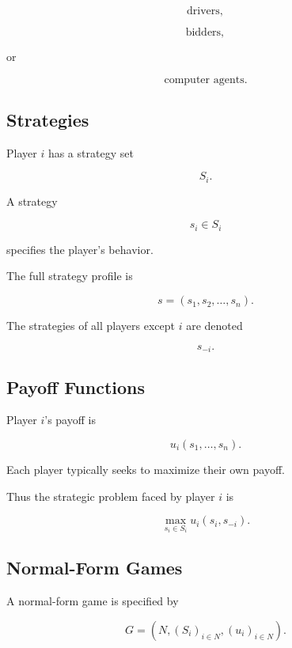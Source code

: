 \[
\boxed{
\text{drivers},
}
\]

\[
\boxed{
\text{bidders},
}
\]

or

\[
\boxed{
\text{computer agents}.
}
\]

\subsection{Strategies}
\label{subsec:game-theory-strategies}

Player \(i\) has a strategy set

\[
\boxed{
S_i.
}
\]

A strategy

\[
s_i\in S_i
\]

specifies the player's behavior.

The full strategy profile is

\[
\boxed{
s
=
(s_1,s_2,\ldots,s_n).
}
\]

The strategies of all players except \(i\) are denoted

\[
\boxed{
s_{-i}.
}
\]

\subsection{Payoff Functions}
\label{subsec:game-theory-payoffs}

Player \(i\)'s payoff is

\[
\boxed{
u_i(s_1,\ldots,s_n).
}
\]

Each player typically seeks to maximize their own payoff.

Thus the strategic problem faced by player \(i\) is

\[
\boxed{
\max_{s_i\in S_i}
u_i(s_i,s_{-i}).
}
\]

\subsection{Normal-Form Games}
\label{subsec:normal-form-games}

A normal-form game is specified by

\[
\boxed{
G
=
\left(
N,
(S_i)_{i\in N},
(u_i)_{i\in N}
\right).
}
\]

